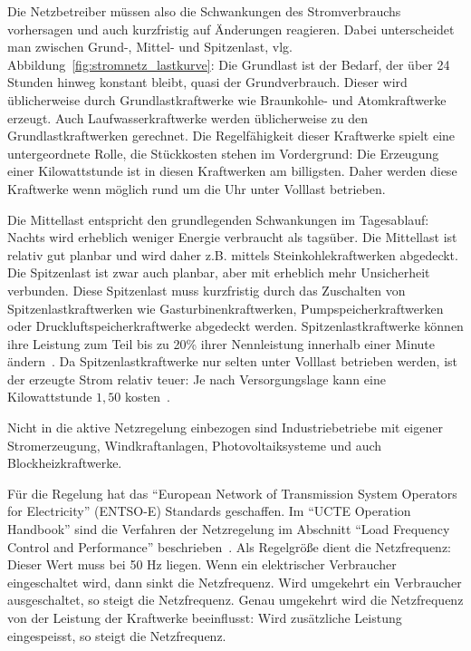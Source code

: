 \documentclass[logo]{fhgart}
\newcommand*\euro{\textup{\EUR}}
\begin{document}
\begin{enumerate}
    Die Netzbetreiber müssen also die Schwankungen des Stromverbrauchs
    vorhersagen und auch kurzfristig auf Änderungen reagieren. Dabei
    unterscheidet man zwischen Grund-, Mittel- und Spitzenlast, vlg.
    Abbildung~\ref{fig:stromnetz_lastkurve}: Die
    Grundlast ist der Bedarf, der über 24 Stunden hinweg konstant
    bleibt, quasi der Grundverbrauch. Dieser wird üblicherweise durch
    Grundlastkraftwerke wie Braunkohle- und Atomkraftwerke erzeugt. Auch
    Laufwasserkraftwerke werden üblicherweise zu den
    Grundlastkraftwerken gerechnet. Die Regelfähigkeit dieser Kraftwerke
    spielt eine untergeordnete Rolle, die Stückkosten stehen im
    Vordergrund: Die Erzeugung einer Kilowattstunde ist in diesen
    Kraftwerken am billigsten. Daher werden diese Kraftwerke wenn
    möglich rund um die Uhr unter Volllast betrieben.

    Die Mittellast entspricht den grundlegenden Schwankungen im
    Tagesablauf: Nachts wird erheblich weniger Energie verbraucht als
    tagsüber. Die Mittellast ist relativ gut planbar und
    wird daher z.B. mittels Steinkohlekraftwerken abgedeckt. Die
    Spitzenlast ist zwar auch planbar, aber mit erheblich mehr
    Unsicherheit verbunden. Diese Spitzenlast muss kurzfristig durch das
    Zuschalten von Spitzenlastkraftwerken wie Gasturbinenkraftwerken,
    Pumpspeicherkraftwerken oder Druckluftspeicherkraftwerke abgedeckt
    werden. Spitzenlastkraftwerke können ihre Leistung zum Teil bis zu
    20\% ihrer Nennleistung innerhalb einer Minute
    ändern~\cite{wikipedia10spitzenlast}\cite[S.
    108ff]{schwab06elektroenergiesysteme}. Da Spitzenlastkraftwerke nur
    selten unter Volllast betrieben werden, ist der erzeugte Strom
    relativ teuer: Je nach Versorgungslage kann eine Kilowattstunde
    \euro $1,50$ kosten~\cite{wikipedia10regelleistung}\cite[S.
    60]{schwab06elektroenergiesysteme}. 

    Nicht in die aktive Netzregelung einbezogen sind Industriebetriebe
    mit eigener Stromerzeugung, Windkraftanlagen, Photovoltaiksysteme
    und auch Blockheizkraftwerke. 

    Für die Regelung hat das "`European Network of Transmission System
    Operators for Electricity"' (ENTSO-E) Standards geschaffen. Im
    "`UCTE Operation Handbook"' sind die Verfahren der Netzregelung im
    Abschnitt "`Load Frequency Control and Performance"'
    beschrieben~\cite{entsoe10ucte}. Als Regelgröße dient die
    Netzfrequenz: Dieser Wert muss bei 50 Hz liegen. Wenn ein
    elektrischer Verbraucher eingeschaltet wird, dann sinkt die
    Netzfrequenz. Wird umgekehrt ein Verbraucher ausgeschaltet, so
    steigt die Netzfrequenz. Genau umgekehrt wird die Netzfrequenz von
    der Leistung der Kraftwerke beeinflusst: Wird zusätzliche Leistung
    eingespeisst, so steigt die Netzfrequenz.


\end{enumerate}
\end{document}
